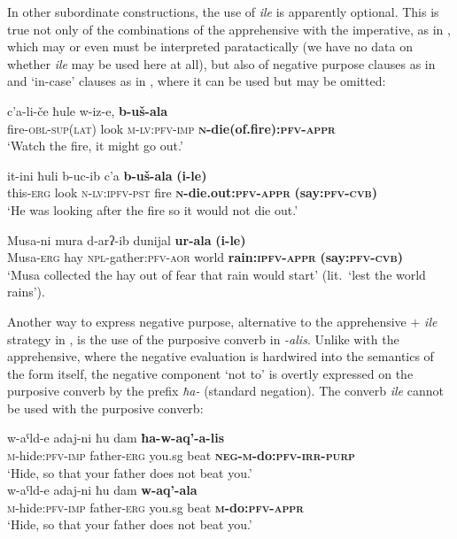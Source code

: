 \documentclass[output=paper,colorlinks,citecolor=brown]{langscibook}
\begin{document}
In other subordinate constructions, the use of \textit{ile} is apparently optional. This is true not only of the combinations of the apprehensive with the imperative, as in , which may or even must be interpreted paratactically (we have no data on whether \textit{ile} may be used here at all), but also of negative purpose clauses as in  and `in-case' clauses as in , where it can be used but may be omitted:

\ea \label{ex:DD44}
\gll c'a-li-če ħule w-iz-e, \textbf{b-uš-ala} \\
fire-\textsc{obl-sup(lat)} look \textsc{m-lv:pfv-imp} \textbf{\textsc{n}-die(of.fire):\textsc{pfv-appr}} \\
\glt `Watch the fire, it might go out.'
\z


\ea \label{ex:DD45}
\gll it-ini ħuli b-uc-ib c'a \textbf{b-uš-ala} \textbf{\textup{(}i-le\textup{)}} \\
this-\textsc{erg} look \textsc{n-lv:ipfv-pst} fire \textbf{\textsc{n}-die.out:\textsc{pfv-appr}} \textbf{(say:\textsc{pfv-cvb})} \\
\glt `He was looking after the fire so it would not die out.'
\z


\ea \label{ex:DD46}
\gll Musa-ni mura d-arʔ-ib dunijal \textbf{ur-ala} \textbf{\textup{(}i-le\textup{)}} \\
Musa-\textsc{erg} hay \textsc{npl}-gather:\textsc{pfv-aor} world \textbf{rain:\textsc{ipfv-appr}} \textbf{(say:\textsc{pfv-cvb})} \\
\glt `Musa collected the hay out of fear that rain would start' (lit.\ `lest the world rains').
\z


 Another way to express negative purpose, alternative to the apprehensive $+$ \textit{ile} strategy in , is the use of the purposive converb in \textit{-alis}. Unlike with the apprehensive, where the negative evaluation is hardwired into the semantics of the form itself, the negative component `not to' is overtly expressed on the purposive converb by the prefix \textit{ħa-} (standard negation). The converb \textit{ile} cannot be used with the purposive converb:


\ea \label{ex:DD47}
\ea \label{ex:DD47a}
\gll w-aˤld-e adaj-ni ħu dam \textbf{ħa-w-aq'-a-lis} \\
\textsc{m}-hide:\textsc{pfv-imp} father-\textsc{erg} you.sg beat \textbf{\textsc{neg-m}-do:\textsc{pfv-irr-purp}} \\
\glt `Hide, so that your father does not beat you.' \\
\ex \label{ex:DD47b}
\gll w-aˤld-e adaj-ni ħu dam \textbf{w-aq'-ala} \\
\textsc{m}-hide:\textsc{pfv-imp} father-\textsc{erg} you.sg beat \textbf{\textsc{m}-do:\textsc{pfv-appr}} \\
\glt `Hide, so that your father does not beat you.'
\z
\z
\end{document}
